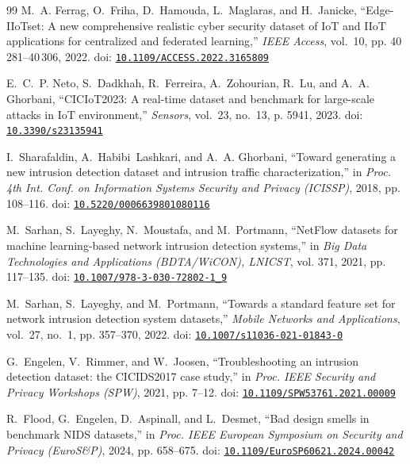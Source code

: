 \begin{thebibliography}{99}
M.~A. Ferrag, O.~Friha, D.~Hamouda, L.~Maglaras, and H.~Janicke,
  ``{Edge-IIoTset}: A new comprehensive realistic cyber security dataset of
  {IoT} and {IIoT} applications for centralized and federated learning,''
  \emph{IEEE Access}, vol.~10, pp. 40\,281--40\,306, 2022. doi:
  \href{https://doi.org/10.1109/ACCESS.2022.3165809}{\nolinkurl{10.1109/ACCESS.2022.3165809}}

E.~C.~P. Neto, S.~Dadkhah, R.~Ferreira, A.~Zohourian, R.~Lu, and A.~A.
  Ghorbani, ``{CICIoT2023}: A real-time dataset and benchmark for large-scale
  attacks in {IoT} environment,'' \emph{Sensors}, vol.~23, no.~13, p. 5941,
  2023. doi:
  \href{https://doi.org/10.3390/s23135941}{\nolinkurl{10.3390/s23135941}}

I.~Sharafaldin, A.~Habibi~Lashkari, and A.~A. Ghorbani, ``Toward generating a
  new intrusion detection dataset and intrusion traffic characterization,'' in
  \emph{Proc. 4th Int. Conf. on Information Systems Security and Privacy
  (ICISSP)}, 2018, pp. 108--116. doi:
  \href{https://doi.org/10.5220/0006639801080116}{\nolinkurl{10.5220/0006639801080116}}

M.~Sarhan, S.~Layeghy, N.~Moustafa, and M.~Portmann, ``{NetFlow} datasets for
  machine learning-based network intrusion detection systems,'' in \emph{Big
  Data Technologies and Applications (BDTA/WiCON), LNICST}, vol. 371, 2021, pp.
  117--135. doi:
  \href{https://doi.org/10.1007/978-3-030-72802-1_9}{\nolinkurl{10.1007/978-3-030-72802-1_9}}

M.~Sarhan, S.~Layeghy, and M.~Portmann, ``Towards a standard feature set for
  network intrusion detection system datasets,'' \emph{Mobile Networks and
  Applications}, vol.~27, no.~1, pp. 357--370, 2022. doi:
  \href{https://doi.org/10.1007/s11036-021-01843-0}{\nolinkurl{10.1007/s11036-021-01843-0}}

G.~Engelen, V.~Rimmer, and W.~Joosen, ``Troubleshooting an intrusion detection
  dataset: the {CICIDS2017} case study,'' in \emph{Proc. IEEE Security and
  Privacy Workshops (SPW)}, 2021, pp. 7--12. doi:
  \href{https://doi.org/10.1109/SPW53761.2021.00009}{\nolinkurl{10.1109/SPW53761.2021.00009}}

R.~Flood, G.~Engelen, D.~Aspinall, and L.~Desmet, ``Bad design smells in
  benchmark {NIDS} datasets,'' in \emph{Proc. IEEE European Symposium on
  Security and Privacy (EuroS\&P)}, 2024, pp. 658--675. doi:
  \href{https://doi.org/10.1109/EuroSP60621.2024.00042}{\nolinkurl{10.1109/EuroSP60621.2024.00042}}


\end{thebibliography}
